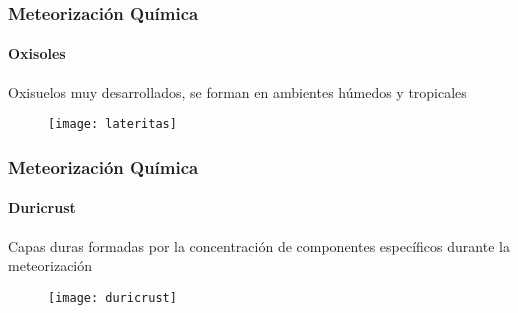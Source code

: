 \documentclass{beamer}
\begin{document}
\begin{frame}
\frametitle{Meteorización Química}
\framesubtitle{Oxisoles}
\small{Oxisuelos muy desarrollados, se forman en ambientes húmedos y tropicales}
\begin{figure}
\begin{center}
   	\texttt{[image: lateritas]}
\end{center}
\end{figure}
\end{frame}
\begin{frame}
\frametitle{Meteorización Química}
\framesubtitle{Duricrust}
\small{Capas duras formadas por la concentración de componentes específicos durante la meteorización}
\begin{figure}
\begin{center}
   	\texttt{[image: duricrust]}
\end{center}
\end{figure}
\end{frame}
\end{document}
